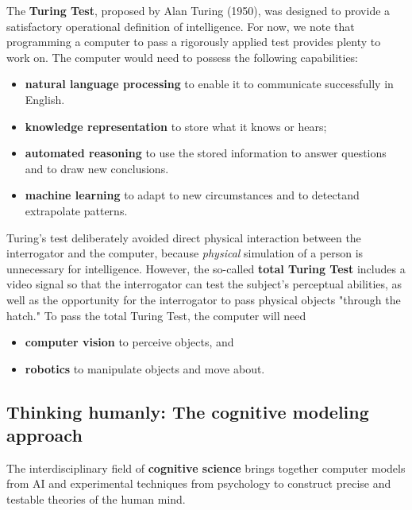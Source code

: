 \documentclass[a4paper,10pt,twoside]{book}
\begin{document}
The \textbf{Turing Test}, proposed by Alan Turing (1950), was designed to provide a satisfactory operational definition of intelligence. For now, we note that programming a computer to pass a rigorously applied test provides plenty to work on. The computer would need to possess the following capabilities:
\begin{itemize}
    \item\textbf{natural language processing} to enable it to communicate successfully in English.
    \item\textbf{knowledge representation} to store what it knows or hears;
    \item\textbf{automated reasoning} to use the stored information to answer questions and to draw new conclusions.
    \item\textbf{machine learning} to adapt to new circumstances and to detectand extrapolate patterns.
\end{itemize}
Turing's test deliberately avoided direct physical interaction between the interrogator and the computer, because \textit{physical} simulation of a person is unnecessary for intelligence. However, the so-called \textbf{total Turing Test} includes a video signal so that the interrogator can test the subject's perceptual abilities, as well as the opportunity for the interrogator to pass physical objects "through the hatch." To pass the total Turing Test, the computer will need
\begin{itemize}
    \item\textbf{computer vision} to perceive objects, and
    \item\textbf{robotics} to manipulate objects and move about.
\end{itemize}

\subsection{Thinking humanly: The cognitive modeling approach}

The interdisciplinary field of \textbf{cognitive science} brings together computer models from AI and experimental techniques from psychology to construct precise and testable theories of the human mind.

\end{document}
